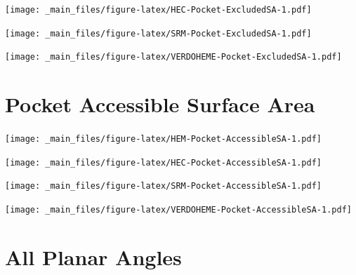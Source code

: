 \documentclass[a4paper, nobind]{templates/ociamthesis}
\let\origfigure\figure
\let\endorigfigure\endfigure
\renewenvironment{figure}[1][2] {
    \expandafter\origfigure\expandafter[H]
} {
    \endorigfigure
}
\begin{document}
\begin{figure}
\centering
\texttt{[image: \_main\_files/figure-latex/HEC-Pocket-ExcludedSA-1.pdf]}
\caption{\label{fig:HEC-Pocket-ExcludedSA}HEC: Pocket Excluded Surface Area}
\end{figure}

\begin{figure}
\centering
\texttt{[image: \_main\_files/figure-latex/SRM-Pocket-ExcludedSA-1.pdf]}
\caption{\label{fig:SRM-Pocket-ExcludedSA}SRM: Pocket Excluded Surface Area}
\end{figure}

\begin{figure}
\centering
\texttt{[image: \_main\_files/figure-latex/VERDOHEME-Pocket-ExcludedSA-1.pdf]}
\caption{\label{fig:VERDOHEME-Pocket-ExcludedSA}VERDOHEME: Pocket Excluded Surface Area}
\end{figure}

\hypertarget{figs-pocketAccSA}{%
\section{Pocket Accessible Surface Area}\label{figs-pocketAccSA}}

\begin{figure}
\centering
\texttt{[image: \_main\_files/figure-latex/HEM-Pocket-AccessibleSA-1.pdf]}
\caption{\label{fig:HEM-Pocket-AccessibleSA}HEM: Pocket Accessible Surface Area}
\end{figure}

\begin{figure}
\centering
\texttt{[image: \_main\_files/figure-latex/HEC-Pocket-AccessibleSA-1.pdf]}
\caption{\label{fig:HEC-Pocket-AccessibleSA}HEC: Pocket Accessible Surface Area}
\end{figure}

\begin{figure}
\centering
\texttt{[image: \_main\_files/figure-latex/SRM-Pocket-AccessibleSA-1.pdf]}
\caption{\label{fig:SRM-Pocket-AccessibleSA}SRM: Pocket Accessible Surface Area}
\end{figure}

\begin{figure}
\centering
\texttt{[image: \_main\_files/figure-latex/VERDOHEME-Pocket-AccessibleSA-1.pdf]}
\caption{\label{fig:VERDOHEME-Pocket-AccessibleSA}VERDOHEME: Pocket Accessible Surface Area}
\end{figure}

\hypertarget{figs-planarAll}{%
\section{All Planar Angles}\label{figs-planarAll}}
\end{document}
